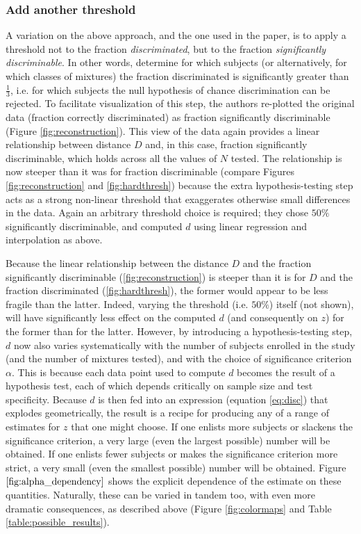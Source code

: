 \documentclass[letterpaper,twocolumn,10pt]{article}
\begin{document}
\subsubsection{Add another threshold} 
A variation on the above approach, and the one used in the paper, 
is to apply a threshold not to the fraction \textit{discriminated}, 
but to the fraction \textit{significantly discriminable}.  
In other words, determine for which subjects (or alternatively, for which classes of mixtures) the fraction discriminated is significantly greater than $\frac{1}{3}$, 
i.e. for which subjects the null hypothesis of chance discrimination can be rejected.  
To facilitate visualization of this step, the authors re-plotted the original data (fraction correctly discriminated) as fraction significantly discriminable (Figure \ref{fig:reconstruction}).  
This view of the data again provides a linear relationship between distance $D$ and, in this case, fraction significantly discriminable, 
which holds across all the values of $N$ tested.  
The relationship is now steeper than it was for fraction discriminable (compare Figures \ref{fig:reconstruction} and \ref{fig:hardthresh}) 
because the extra hypothesis-testing step acts as a strong non-linear threshold that exaggerates otherwise small differences in the data.  
Again an arbitrary threshold choice is required; they chose $50\%$ significantly discriminable, 
and computed $d$ using linear regression and interpolation as above.  

Because the linear relationship between the distance $D$ and the fraction significantly discriminable (\ref{fig:reconstruction}) is steeper than it is for $D$ and the fraction discriminated (\ref{fig:hardthresh}), 
the former would appear to be less fragile than the latter.  
Indeed, varying the threshold (i.e. $50\%$) itself (not shown), 
will have significantly less effect on the computed $d$ (and consequently on $z$) for the former than for the latter.  
However, by introducing a hypothesis-testing step, $d$ now also varies systematically with the number of subjects enrolled in the study (and the number of mixtures tested), 
and with the choice of significance criterion $\alpha$.  
This is because each data point used to compute $d$ becomes the result of a hypothesis test, 
each of which depends critically on sample size and test specificity.  
Because $d$ is then fed into an expression (equation \ref{eq:disc}) that explodes geometrically, 
the result is a recipe for producing any of a range of estimates for $z$ that one might choose. 
If one enlists more subjects or slackens the significance criterion, 
a very large (even the largest possible) number will be obtained. 
If one enlists fewer subjects or makes the significance criterion more strict, 
a very small (even the smallest possible) number will be obtained. 
Figure $\ref{fig:alpha_dependency}$ shows the explicit dependence of the estimate on these quantities. 
Naturally, these can be varied in tandem too, with even more dramatic consequences, 
as described above (Figure \ref{fig:colormaps} and Table \ref{table:possible_results}). 
\end{document}
